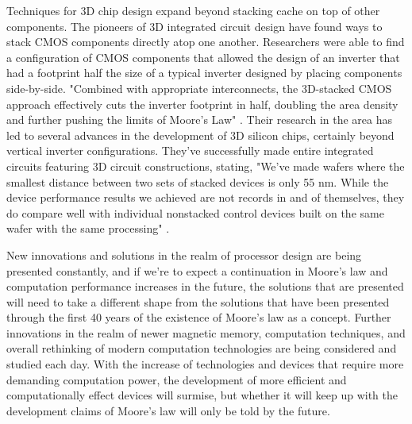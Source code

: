 \documentclass[12pt]{article}
\begin{document}
\begin{flushleft}
Techniques for 3D chip design expand beyond stacking
cache on top of other components. The pioneers of 3D
integrated circuit design have found ways to stack
CMOS components directly atop one another. Researchers
were able to find a configuration of CMOS components
that allowed the design of an inverter that had a footprint
half the size of a typical inverter designed by
placing components side-by-side. "Combined with appropriate
interconnects, the 3D-stacked CMOS approach effectively
cuts the inverter footprint in half, doubling the
area density and further pushing the limits of Moore's
Law" \parencite{9976473}. Their research in the area has
led to several advances in the development of 3D silicon
chips, certainly beyond vertical inverter configurations.
They've successfully made entire integrated circuits
featuring 3D circuit constructions, stating, "We've made
wafers where the smallest distance between two sets
of stacked devices is only 55 nm. While the device
performance results we achieved are not records in
and of themselves, they do compare well with individual
nonstacked control devices built on the same wafer
with the same processing" \parencite{9976473}.

New innovations and solutions in the realm of processor
design are being presented constantly, and if we're
to expect a continuation in Moore's law and computation
performance increases in the future, the solutions
that are presented will need to take a different shape
from the solutions that have been presented through
the first 40 years of the existence of Moore's law
as a concept. Further innovations in the realm of newer
magnetic memory, computation techniques, and overall
rethinking of modern computation technologies are being
considered and studied each day. With the increase
of technologies and devices that require more demanding
computation power, the development of more efficient
and computationally effect devices will surmise, but
whether it will keep up with the development claims
of Moore's law will only be told by the future.



\newpage


\newpage
\nocite{*}
\printbibliography

\end{flushleft}
\end{document}
